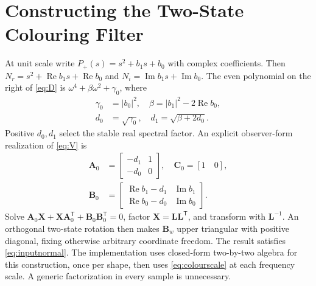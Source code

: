 \documentclass[conference]{IEEEtran}
\newcommand{\mt}[1]{\bm{#1}}
\newcommand{\tr}{^{\mathsf T}}
\DeclareMathOperator{\Rea}{Re}
\DeclareMathOperator{\Ima}{Im}
\begin{document}
\FloatBarrier\appendices
\section{Constructing the Two-State Colouring Filter}
\label{app:colour}
At unit scale write $P_+(s)=s^2+b_1s+b_0$ with complex coefficients.
Then $N_r=s^2+\Rea b_1s+\Rea b_0$ and
$N_i=\Ima b_1s+\Ima b_0$. The even polynomial on the right of
\cref{eq:D} is $\omega^4+\beta\omega^2+\gamma_0$, where
\begin{align}
 \gamma_0&=|b_0|^2,\quad \beta=|b_1|^2-2\Rea b_0,\nonumber\\
 d_0&=\sqrt{\gamma_0},\quad d_1=\sqrt{\beta+2d_0}.
 \label{eq:Dcoeff}
\end{align}
Positive $d_0,d_1$ select the stable real spectral factor. An explicit
observer-form realization of \cref{eq:V} is
\begin{align}
 \mt A_0&=\begin{bmatrix}-d_1&1\\-d_0&0\end{bmatrix},\quad
 \mt C_0=[1\quad0],\nonumber\\
 \mt B_0&=\begin{bmatrix}\Rea b_1-d_1&\Ima b_1\\
                         \Rea b_0-d_0&\Ima b_0\end{bmatrix}.
 \label{eq:observercolour}
\end{align}
Solve $\mt A_0\mt X+\mt X\mt A_0\tr+\mt B_0\mt B_0\tr=0$,
factor $\mt X=\mt L\mt L\tr$, and transform with $\mt L^{-1}$.
An orthogonal two-state rotation then makes $\mt B_w$ upper triangular
with positive diagonal, fixing otherwise arbitrary coordinate freedom.
The result satisfies \cref{eq:inputnormal}. The implementation uses
closed-form two-by-two algebra for this construction, once per shape,
then uses \cref{eq:colourscale} at each frequency scale. A generic
factorization in every sample is unnecessary.
\end{document}
